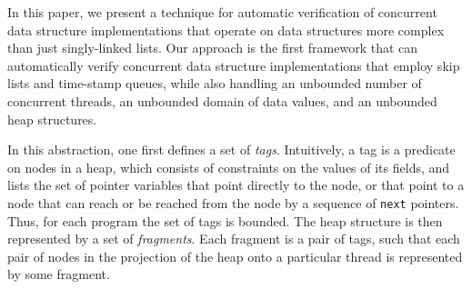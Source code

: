 In this paper, we present
a technique for automatic verification of
concurrent data structure implementations that operate on data structures
more complex than just singly-linked lists.
Our approach is the first framework that can automatically
verify concurrent data structure implementations that employ skip lists and
time-stamp queues, while also handling
an unbounded number of concurrent threads, an
unbounded domain of data values, and an unbounded heap structures.

In this abstraction, one first defines a
set of {\em tags}. Intuitively, a tag is a predicate on nodes in a heap,
which consists of constraints on the values of its fields, and lists
the set of pointer variables that point directly to the node, or that point
to a node that can reach or be reached from the node by a sequence of
{\tt next} pointers. Thus, for each program the set of tags is bounded.
The heap structure is then represented by a set of {\em fragments}. Each
fragment is a pair of tags, such that each pair of nodes in the
projection of the heap onto a particular thread is represented by some
fragment.




